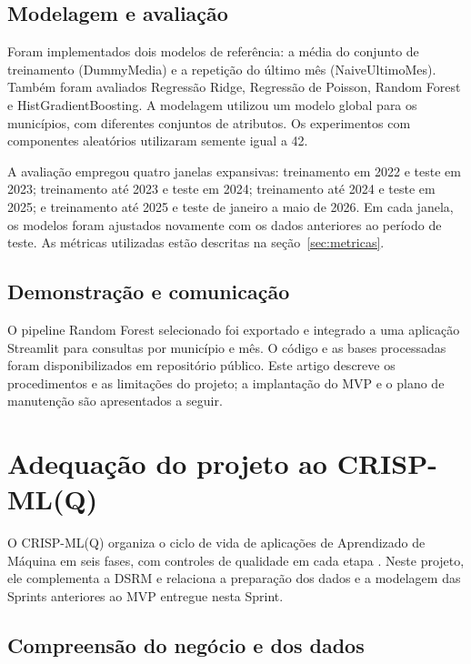 \documentclass[12pt]{article}
\begin{document}
\subsection{Modelagem e avaliação}

Foram implementados dois modelos de referência: a média do conjunto de treinamento (DummyMedia) e a repetição do último mês (NaiveUltimoMes). Também foram avaliados Regressão Ridge, Regressão de Poisson, Random Forest e HistGradientBoosting. A modelagem utilizou um modelo global para os municípios, com diferentes conjuntos de atributos. Os experimentos com componentes aleatórios utilizaram semente igual a 42.

A avaliação empregou quatro janelas expansivas: treinamento em 2022 e teste em 2023; treinamento até 2023 e teste em 2024; treinamento até 2024 e teste em 2025; e treinamento até 2025 e teste de janeiro a maio de 2026. Em cada janela, os modelos foram ajustados novamente com os dados anteriores ao período de teste. As métricas utilizadas estão descritas na seção~\ref{sec:metricas}.

\subsection{Demonstração e comunicação}

O pipeline Random Forest selecionado foi exportado e integrado a uma aplicação Streamlit para consultas por município e mês. O código e as bases processadas foram disponibilizados em repositório público. Este artigo descreve os procedimentos e as limitações do projeto; a implantação do MVP e o plano de manutenção são apresentados a seguir.

\section{Adequação do projeto ao CRISP-ML(Q)}
\label{sec:crispmlq}

O CRISP-ML(Q) organiza o ciclo de vida de aplicações de Aprendizado de Máquina em seis fases, com controles de qualidade em cada etapa \cite{studer2021crispmlq}. Neste projeto, ele complementa a DSRM e relaciona a preparação dos dados e a modelagem das Sprints anteriores ao MVP entregue nesta Sprint.

\subsection{Compreensão do negócio e dos dados}
\end{document}
